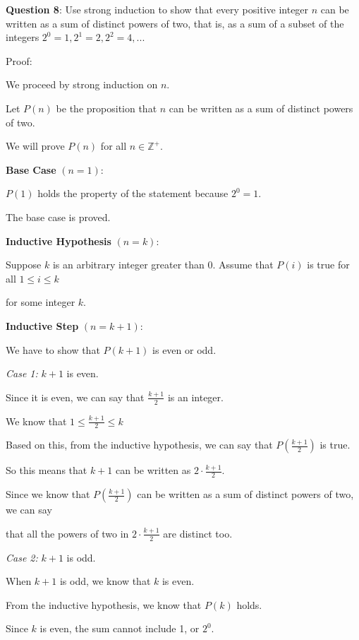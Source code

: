 \documentclass{article} %
\newcommand{\question}[2][]{\begin{flushleft}
        \textbf{Question #1}: #2

\end{flushleft}}
\begin{document}
    \question[8]{Use strong induction to show that every positive integer $n$ can be written as a sum
    of distinct powers of two, that is, as a sum of a subset of the integers $2^0 = 1, 2^1 = 2, 2^2 = 4, ...$}

    Proof:

    We proceed by strong induction on $n$.

    Let $P(n)$ be the proposition that $n$ can be written as a sum of distinct powers of two.

    We will prove $P(n)$ for all $n \in \mathbb{Z}^+$.

    \textbf{Base Case} $(n = 1)$:

    $P(1)$ holds the property of the statement because $2^0 = 1$.

    The base case is proved.

    \textbf{Inductive Hypothesis} $(n = k)$:

    Suppose $k$ is an arbitrary integer greater than 0. Assume that $P(i)$ is true for all $1 \leq i \leq k$ 
    
    for some integer $k$.

    \textbf{Inductive Step} $(n = k + 1)$:

    We have to show that $P(k + 1)$ is even or odd.

    \textit{Case 1:} $k + 1$ is even.

    \tabto{1cm} Since it is even, we can say that $\frac{k + 1}{2}$ is an integer. 

    \tabto{1cm} We know that $1 \leq \frac{k + 1}{2} \leq k$ 

    \tabto{1cm} Based on this, from the inductive hypothesis, we can say that $P(\frac{k + 1}{2})$ is true.

    \tabto{1cm} So this means that $k + 1$ can be written as $2 \cdot \frac{k + 1}{2}$.

    \tabto{1cm} Since we know that $P(\frac{k + 1}{2})$ can be written as a sum of distinct powers of two, we can say 
    
    \tabto{1cm} that all the powers of two in $2 \cdot \frac{k + 1}{2}$ are distinct too.

    \textit{Case 2:} $k + 1$ is odd.
    
    \tabto{1cm} When $k + 1$ is odd, we know that $k$ is even.

    \tabto{1cm} From the inductive hypothesis, we know that $P(k)$ holds.

    \tabto{1cm} Since $k$ is even, the sum cannot include 1, or $2^0$.
\end{document}
